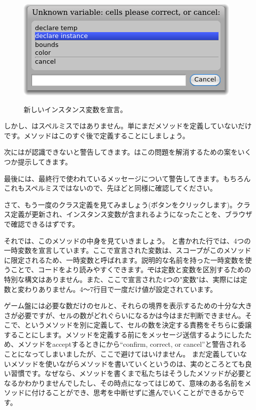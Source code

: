 \documentclass[a4paper,10pt,twoside]{book}
\begin{document}
\begin{figure}[htb]
\begin{minipage}{0.48\textwidth}
		{\includegraphics[scale=0.7]{DeclareInstanceVar}}
	\caption{新しいインスタンス変数を宣言。}
\end{minipage}
\end{figure}

しかし、はスペルミスではありません。単にまだメソッドを定義していないだけです。メソッドはこのすぐ後で定義することにしましょう。


次に\pharo はが認識できないと警告してきます。\pharo はこの問題を解消するための案をいくつか提示してきます。


最後に\pharo は、最終行で使われているメッセージについて警告してきます。もちろんこれもスペルミスではないので、先ほどと同様に確認してください。


さて、もう一度のクラス定義を見てみましょう(ボタンをクリックします)。クラス定義が更新され、インスタンス変数が含まれるようになったことを、ブラウザで確認できるはずです。

それでは、このメソッドの中身を見ていきましょう。
と書かれた行では、4つの一時変数を宣言しています。ここで宣言された変数は、スコープがこのメソッドに限定されるため、一時変数と呼ばれます。説明的な名前を持った一時変数を使うことで、コードをより読みやすくできます。\st では定数と変数を区別するための特別な構文はありません。また、ここで宣言された4つの"変数"は、実際には定数と変わりありません。4〜7行目で一度だけ値が設定されています。

ゲーム盤には必要な数だけのセルと、それらの境界を表示するための十分な大きさが必要ですが、セルの数がどれぐらいになるかは今はまだ判断できません。そこで、というメソッドを別に定義して、セルの数を決定する責務をそちらに委譲することにします。メソッドを定義する前にをメッセージ送信するようにしたため、メソッドをacceptするときに\pharo から``confirm, correct, or cancel''と警告されることになってしまいましたが、ここで避けてはいけません。
まだ定義していないメソッドを使いながらメソッドを書いていくというのは、実のところとても良い習慣です。なぜなら、メソッドを書くまで私たちはそうしたメソッドが必要となるかわかりませんでしたし、その時点になってはじめて、意味のある名前をメソッドに付けることができ、思考を中断せずに進んでいくことができるからです。
\end{document}

